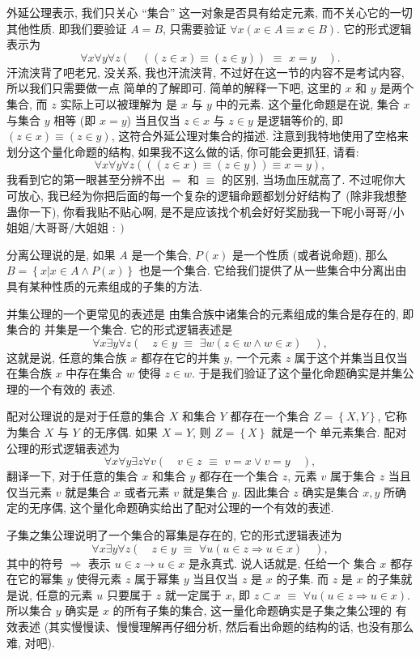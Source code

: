 \documentclass[10pt,UTF8]{book} %
\begin{document}
外延公理表示, {\kaishu 我们只关心 “集合” 这一对象是否具有给定元素, 而不关心它的一切其他性质}.
即我们要验证 $A = B$, 只需要验证 $\forall x \left( x \in A \equiv x \in B \right)$.
它的形式逻辑表示为
\[ \forall x \forall y \forall z \left( \quad
    ((z \in x) \equiv (z \in y)) \,\, \equiv \,\, x=y
\quad \right). \]
汗流浃背了吧老兄, 没关系, 我也汗流浃背, 不过好在这一节的内容不是考试内容, 所以我们只需要做一点
简单的了解即可. 简单的解释一下吧, 这里的 $x$ 和 $y$ 是两个集合, 而 $z$ 实际上可以被理解为
是 $x$ 与 $y$ 中的元素. 这个量化命题是在说, 
{\kaishu 集合 $x$ 与集合 $y$ 相等 (即 $x=y$)} 当且仅当 {\kaishu $z \in x$ 与 $z \in y$
是逻辑等价的, 即 $(z \in x) \equiv (z \in y)$}, 这符合外延公理对集合的描述.
注意到我特地使用了空格来划分这个量化命题的结构, 如果我不这么做的话, 你可能会更抓狂,
请看:
\[ \forall x \forall y \forall z \left(
((z \in x) \equiv (z \in y)) \equiv x=y
\right), \]
我看到它的第一眼甚至分辨不出 $=$ 和 $\equiv$ 的区别, 当场血压就高了. 不过呢你大可放心,
我已经为你把后面的每一个复杂的逻辑命题都划分好结构了 (除非我想整蛊你一下), 
你看我贴不贴心啊, 是不是应该找个机会好好奖励我一下呢小哥哥/小姐姐/大哥哥/大姐姐 $\left.:\right)$

分离公理说的是, 如果 $A$ 是一个集合, $P(x)$ 是一个性质 (或者说命题),
那么 $B = \left\{ x | x \in A \wedge P(x) \right\}$ 也是一个集合.
它给我们提供了从一些集合中分离出由具有某种性质的元素组成的子集的方法.

并集公理的一个更常见的表述是 {\kaishu 由集合族中诸集合的元素组成的集合是存在的}, 即集合的
并集是一个集合. 它的形式逻辑表述是
\[ \forall x \exists y \forall z \left( \quad
    z \in y \,\,\equiv\,\, \exists w \left(
        z \in w \wedge w \in x
    \right) \quad 
\right), \]
这就是说, {\kaishu 任意的集合族 $x$ 都存在它的并集 $y$, 一个元素 $z$ 属于这个并集当且仅当在集合族
$x$ 中存在集合 $w$ 使得 $z \in w$}. 于是我们验证了这个量化命题确实是并集公理的一个有效的
表述.

配对公理说的是对于任意的集合 $X$ 和集合 $Y$ 都存在一个集合 $Z = \left\{ X,Y \right\}$,
它称为集合 $X$ 与 $Y$ 的无序偶. 如果 $X=Y$, 则 $Z = \left\{ X \right\}$ 就是一个
单元素集合. 配对公理的形式逻辑表述为
\[ \forall x \forall y \exists z \forall v \left(\quad
    v \in z \,\, \equiv \,\, v = x \vee v = y
\quad\right), \]
翻译一下, {\kaishu 对于任意的集合 $x$ 和集合 $y$ 都存在一个集合 $z$, 元素 $v$ 属于集合 $z$
当且仅当元素 $v$ 就是集合 $x$ 或者元素 $v$ 就是集合 $y$}. 因此集合 $z$ 确实是集合 $x,y$
所确定的无序偶, 这个量化命题确实给出了配对公理的一个有效的表述.

子集之集公理说明了一个集合的幂集是存在的, 它的形式逻辑表述为
\[ \forall x \exists y \forall z \left(
    \quad
    z \in y \,\, \equiv\,\, 
    \forall u \left(
        u \in z \Rightarrow u \in x
    \right)
    \quad
\right), \]
其中的符号 $\Rightarrow$ 表示 $u \in z \to u \in x$ 是永真式. 说人话就是, 任给一个
集合 $x$ 都存在它的幂集 $y$ 使得元素 $z$ 属于幂集 $y$ 当且仅当 $z$ 是 $x$ 的子集.
而 $z$ 是 $x$ 的子集就是说, 任意的元素 $u$ 只要属于 $z$ 就一定属于 $x$, 即
$z \subset x \,\, \equiv \,\, \forall u \left(
    u \in z \Longrightarrow u \in x
\right)$. 所以集合 $y$ 确实是 $x$ 的所有子集的集合, 这一量化命题确实是子集之集公理的
有效表述 (其实慢慢读、慢慢理解再仔细分析, 然后看出命题的结构的话, 也没有那么难, 对吧).
\end{document}
